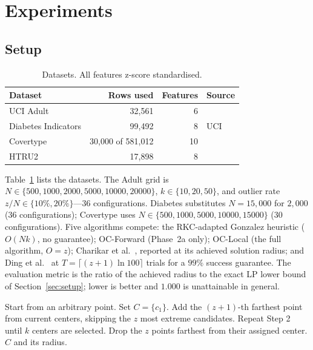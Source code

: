 \documentclass[twoside,leqno,twocolumn]{article}
\begin{document}
\section{Experiments}
\label{sec:experiments}

\subsection{Setup}
\label{sec:expsetup}

\begin{table}[t]
\caption{Datasets. All features z-score standardised.}
\label{tab:datasets}
\centering
\begin{tabular}{lrrl}
\toprule
Dataset & Rows used & Features & Source \\
\midrule
UCI Adult & 32{,}561 & 6 & \cite{adult_dataset} \\
Diabetes Indicators & 99{,}492 & 8 & UCI \\
Covertype & 30{,}000 of 581{,}012 & 10 & \cite{covertype_dataset} \\
HTRU2 & 17{,}898 & 8 & \cite{htru2} \\
\bottomrule
\end{tabular}
\end{table}

Table~\ref{tab:datasets} lists the datasets. The Adult grid is
$N\in\{500,1000,2000,5000,10000,20000\}$, $k\in\{10,20,50\}$, and
outlier rate $z/N\in\{10\%,20\%\}$---36 configurations. Diabetes
substitutes $N=15{,}000$ for $2{,}000$ (36 configurations); Covertype
uses $N\in\{500,1000,5000,10000,15000\}$ (30 configurations). Five
algorithms compete: the RKC-adapted Gonzalez heuristic ($O(Nk)$, no
guarantee); OC-Forward (Phase~2a only); OC-Local (the full
algorithm, $O=z$); Charikar et al.\ \cite{charikar2001}, reported at
its achieved solution radius; and Ding et al.\ \cite{ding2019} at
$T=\lceil(z{+}1)\ln 100\rceil$ trials for a $99\%$ success guarantee.
The evaluation metric is the ratio of the achieved radius to the exact
LP lower bound of Section~\ref{sec:setup}; lower is better and
$1.000$ is unattainable in general.

\begin{algorithm}[t]
\caption{RKC-Gonzalez$(X, k, z)$}
\label{alg:rkcgonzalez}
\begin{algorithmic}[1]
\State Start from an arbitrary point. Set $C = \{c_1\}$.
\State Add the $(z{+}1)$-th farthest point from current centers,
       skipping the $z$ most extreme candidates.
\State Repeat Step 2 until $k$ centers are selected.
\State Drop the $z$ points farthest from their assigned center.
\State \Return $C$ and its radius.
\end{algorithmic}
\end{algorithm}
\end{document}
